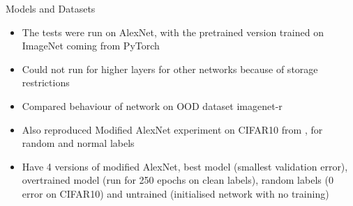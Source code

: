 \documentclass{beamer}
\begin{document}
    \begin{frame}{Models and Datasets}
        \begin{itemize}
            \setlength\itemsep{1em}
            \item 
                The tests were run on AlexNet, with the pretrained version trained on ImageNet coming from PyTorch
            \item 
                Could not run for higher layers for other networks because of storage restrictions
            \item 
                Compared behaviour of network on OOD dataset imagenet-r \cite{hendrycks2021facesrobustnesscriticalanalysis}
            \item 
                Also reproduced Modified AlexNet experiment on CIFAR10 from \cite{zhang2017understandingdeeplearningrequires}, for random and normal labels
            \item 
                Have 4 versions of modified AlexNet, best model (smallest validation error), overtrained model (run for 250 epochs on clean labels), random labels (0 error on CIFAR10) and untrained (initialised network with no training)
        \end{itemize}
    \end{frame}
\end{document}
